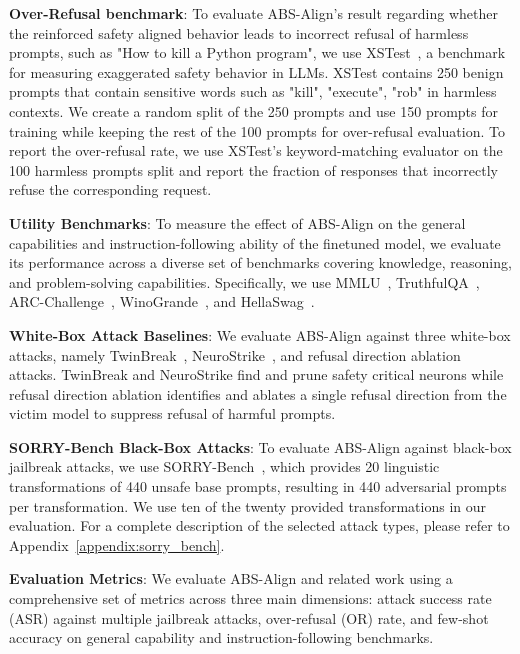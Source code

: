 \textbf{Over-Refusal benchmark}: To evaluate ABS-Align's result regarding whether the reinforced safety aligned behavior leads to incorrect refusal of harmless prompts, such as "How to kill a Python program", we use XSTest~\cite{rottger2024xstest}, a benchmark for measuring exaggerated safety behavior in LLMs. XSTest contains 250 benign prompts that contain sensitive words such as "kill", "execute", "rob" in harmless contexts. We create a random split of the 250 prompts and use 150 prompts for training while keeping the rest of the 100 prompts for over-refusal evaluation. To report the over-refusal rate, we use XSTest's keyword-matching evaluator on the 100 harmless prompts split and report the fraction of responses that incorrectly refuse the corresponding request.

\textbf{Utility Benchmarks}: To measure the effect of ABS-Align on the general capabilities and instruction-following ability of the finetuned model, we evaluate its performance across a diverse set of benchmarks covering knowledge, reasoning, and problem-solving capabilities. Specifically, we use MMLU~\cite{hendrycks2021mmlu}, TruthfulQA~\cite{truthfulqa}, ARC-Challenge~\cite{arc_challenge}, WinoGrande~\cite{WinoGrande}, and HellaSwag~\cite{hellaswag}.


\textbf{White-Box Attack Baselines}: We evaluate ABS-Align against three white-box attacks, namely TwinBreak~\cite{twinbreak}, NeuroStrike~\cite{wu2026neurostrike}, and refusal direction ablation~\cite{arditi2024refusal} attacks. TwinBreak and NeuroStrike find and prune safety critical neurons while refusal direction ablation identifies and ablates a single refusal direction from the victim model to suppress refusal of harmful prompts.

\textbf{SORRY-Bench Black-Box Attacks}: To evaluate ABS-Align against black-box jailbreak attacks, we use SORRY-Bench~\cite{xie2025sorrybench}, which provides 20 linguistic transformations of 440 unsafe base prompts, resulting in 440 adversarial prompts per transformation. We use ten of the twenty provided transformations in our evaluation. For a complete description of the selected attack types, please refer to Appendix~\ref{appendix:sorry_bench}.

\textbf{Evaluation Metrics}: We evaluate ABS-Align and related work using a comprehensive set of metrics across three main dimensions: attack success rate (ASR) against multiple jailbreak attacks, over-refusal (OR) rate, and few-shot accuracy on general capability and instruction-following benchmarks.

